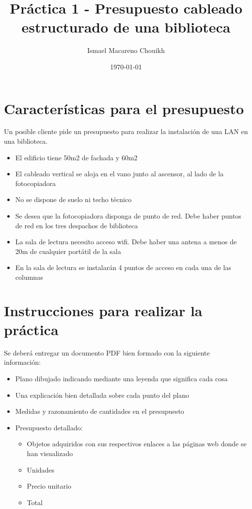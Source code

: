 \documentclass[11pt]{article}
\author{Ismael Macareno Chouikh}
\date{\today}
\title{Práctica 1 - Presupuesto cableado estructurado de una biblioteca}
\newcommand\blankpage{\null\thispagestyle{empty}\newpage}
\begin{document}
\maketitle
\tableofcontents

\blankpage

\section{Características para el presupuesto}
\label{sec:orgb533495}
Un posible cliente pide un presupuesto para realizar la instalación de una LAN en una biblioteca.
\begin{itemize}
\item El edificio tiene 50m2 de fachada y 60m2
\item El cableado vertical se aloja en el vano junto al ascensor, al lado de la fotocopiadora
\item No se dispone de suelo ni techo técnico
\item Se desea que la fotocopiadora disponga de punto de red. Debe haber puntos de red en los tres despachos de biblioteca
\item La sala de lectura necesito acceso wifi. Debe haber una antena a menos de 20m de cualquier portátil de la sala
\item En la sala de lectura se instalarán 4 puntos de acceso en cada una de las columnas
\end{itemize}


\section{Instrucciones para realizar la práctica}
\label{sec:org3fe9c4f}
Se deberá entregar un documento PDF bien formado con la siguiente información:
\begin{itemize}
\item Plano dibujado indicando mediante una leyenda que significa cada cosa
\item Una explicación bien detallada sobre cada punto del plano
\item Medidas y razonamiento de cantidades en el presupuesto
\item Presupuesto detallado:
\begin{itemize}
\item Objetos adquiridos con sus respectivos enlaces a las páginas web donde se han visualizado
\item Unidades
\item Precio unitario
\item Total
\end{itemize}
\end{itemize}
\end{document}
